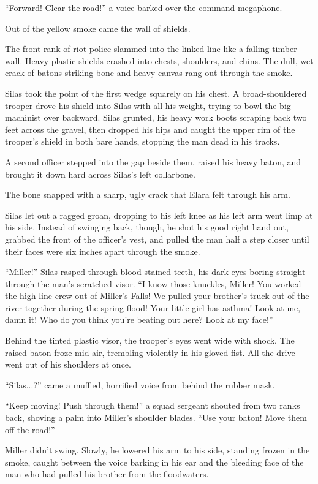 ``Forward! Clear the road!'' a voice barked over the command megaphone.

Out of the yellow smoke came the wall of shields.

The front rank of riot police slammed into the linked line like a falling timber wall. Heavy plastic shields crashed into chests, shoulders, and chins. The dull, wet crack of batons striking bone and heavy canvas rang out through the smoke.

Silas took the point of the first wedge squarely on his chest. A broad-shouldered trooper drove his shield into Silas with all his weight, trying to bowl the big machinist over backward. Silas grunted, his heavy work boots scraping back two feet across the gravel, then dropped his hips and caught the upper rim of the trooper's shield in both bare hands, stopping the man dead in his tracks. 

A second officer stepped into the gap beside them, raised his heavy baton, and brought it down hard across Silas’s left collarbone. 

The bone snapped with a sharp, ugly crack that Elara felt through his arm. 

Silas let out a ragged groan, dropping to his left knee as his left arm went limp at his side. Instead of swinging back, though, he shot his good right hand out, grabbed the front of the officer’s vest, and pulled the man half a step closer until their faces were six inches apart through the smoke.

``Miller!'' Silas rasped through blood-stained teeth, his dark eyes boring straight through the man's scratched visor. ``I know those knuckles, Miller! You worked the high-line crew out of Miller's Falls! We pulled your brother's truck out of the river together during the spring flood! Your little girl has asthma! Look at me, damn it! Who do you think you're beating out here? Look at my face!''

Behind the tinted plastic visor, the trooper’s eyes went wide with shock. The raised baton froze mid-air, trembling violently in his gloved fist. All the drive went out of his shoulders at once. 

``Silas...?'' came a muffled, horrified voice from behind the rubber mask.

``Keep moving! Push through them!'' a squad sergeant shouted from two ranks back, shoving a palm into Miller's shoulder blades. ``Use your baton! Move them off the road!''

Miller didn't swing. Slowly, he lowered his arm to his side, standing frozen in the smoke, caught between the voice barking in his ear and the bleeding face of the man who had pulled his brother from the floodwaters.

